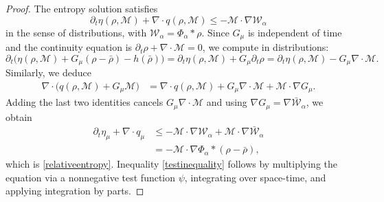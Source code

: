 \documentclass[reqno,11pt]{amsart}
\numberwithin{equation}{section}
\theoremstyle{definition}
\begin{document}
\begin{proof}
The entropy solution satisfies
\[
  \partial_t\eta(\rho,\mathcal{M})+
  \nabla\cdot q(\rho,\mathcal{M})
  \le -\mathcal M\cdot\nabla\mathcal W_\alpha
\]
in the sense of distributions, 
with $\mathcal W_\alpha=\Phi_\alpha*\rho$.  Since $G_\mu$ is independent of time and the continuity equation is
$\partial_t\rho+\nabla\cdot\mathcal M=0$, we compute in distributions:
\[\partial_t\big(\eta(\rho,\mathcal M)+G_\mu(\rho-\bar\rho)-h(\bar\rho)\big)
=\partial_t\eta(\rho,\mathcal M)+G_\mu\partial_t\rho=\partial_t\eta(\rho,\mathcal M)-G_\mu\nabla\cdot\mathcal M.
\]
Similarly, we deduce 
\[
\begin{aligned}
\nabla\cdot\big(q(\rho,\mathcal M)+G_\mu\mathcal M\big) &=\nabla\cdot q(\rho,\mathcal M)+G_\mu\nabla\cdot\mathcal M+\mathcal M\cdot\nabla G_\mu.
\end{aligned}
\]
Adding the last two identities cancels $G_\mu\nabla\cdot\mathcal M$ and using 
$\nabla G_\mu=\nabla\bar{\mathcal W}_\alpha$, we obtain
\[
\begin{aligned}
\partial_t\eta_\mu+\nabla\cdot q_\mu
&\le -\mathcal M\cdot\nabla\mathcal W_\alpha +\mathcal M\cdot\nabla\bar{\mathcal W}_\alpha  \\
&=-\mathcal M\cdot\nabla\Phi_\alpha*(\rho-\bar\rho),
\end{aligned}
\]
which is \eqref{relativeentropy}.  
Inequality \eqref{testinequality} follows by multiplying the equation via a nonnegative test function $\psi$, integrating over space-time, and applying integration by parts.
\end{proof}
\end{document}
